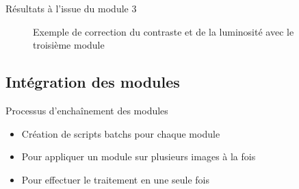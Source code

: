 \documentclass{beamer}
\begin{document}
\begin{frame}{Résultats à l'issue du module 3}
\begin{figure}[htp]
 \centering
 \caption{Exemple de correction du contraste et de la luminosité avec le troisième module}
 \label{fig:ContExemple}
\end{figure}
\end{frame}

\subsection{Intégration des modules}

\begin{frame}{Processus d'enchaînement des modules}
\begin{itemize}
\item Création de scripts batchs pour chaque module
\item Pour appliquer un module sur plusieurs images à la fois 
\item Pour effectuer le traitement en une seule fois
\end{itemize}
\end{frame}
\end{document}
